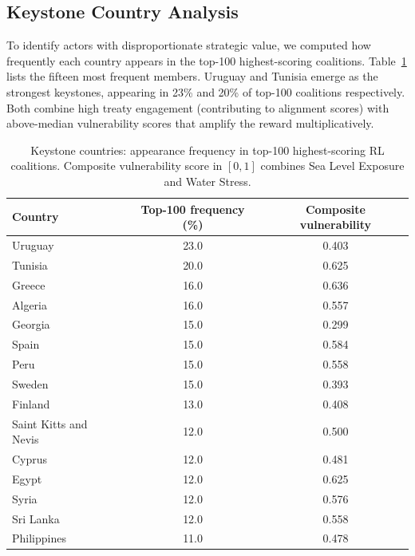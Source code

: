 \documentclass[11pt]{article}
\begin{document}
\subsection{Keystone Country Analysis}
\label{sec:results_keystone}

To identify actors with disproportionate strategic value, we computed how frequently each country appears in the top-100 highest-scoring coalitions. Table~\ref{tab:keystone_countries} lists the fifteen most frequent members. Uruguay and Tunisia emerge as the strongest keystones, appearing in 23\% and 20\% of top-100 coalitions respectively. Both combine high treaty engagement (contributing to alignment scores) with above-median vulnerability scores that amplify the reward multiplicatively.

\begin{table}[htbp]
\centering
\caption{Keystone countries: appearance frequency in top-100 highest-scoring RL coalitions. Composite vulnerability score in $[0,1]$ combines Sea Level Exposure and Water Stress.}
\label{tab:keystone_countries}
\small
\begin{tabular}{lcc}
\toprule
\textbf{Country} & \textbf{Top-100 frequency (\%)} & \textbf{Composite vulnerability} \\
\midrule
Uruguay              & 23.0 & 0.403 \\
Tunisia              & 20.0 & 0.625 \\
Greece               & 16.0 & 0.636 \\
Algeria              & 16.0 & 0.557 \\
Georgia              & 15.0 & 0.299 \\
Spain                & 15.0 & 0.584 \\
Peru                 & 15.0 & 0.558 \\
Sweden               & 15.0 & 0.393 \\
Finland              & 13.0 & 0.408 \\
Saint Kitts and Nevis & 12.0 & 0.500 \\
Cyprus               & 12.0 & 0.481 \\
Egypt                & 12.0 & 0.625 \\
Syria                & 12.0 & 0.576 \\
Sri Lanka            & 12.0 & 0.558 \\
Philippines          & 11.0 & 0.478 \\
\bottomrule
\end{tabular}
\end{table}
\end{document}
